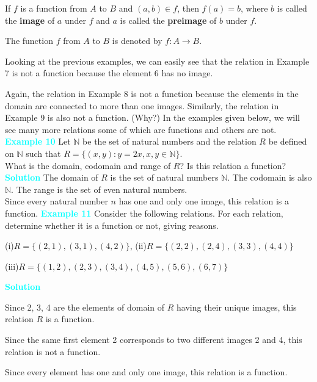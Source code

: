 \documentclass[11pt]{article}
\begin{document}
If $f$ is a function from $A$ to $B$ and $(a, b) \in f$, then $f(a) = b$, where $b$ is called the \textbf{image} of $a$ under $f$ and $a$ is called the \textbf{preimage} of $b$ under $f$.

 The function $f$ from $A$ to $B$ is denoted by $f: A \to B$.
\vspace{10pt}

 Looking at the previous examples, we can easily see that the relation in Example 7 is not a function because the element 6 has no image.

\vspace{5pt}
 Again, the relation in Example 8 is not a function because the elements in the domain are connected to more than one images. Similarly, the relation in Example 9 is also not a function. (Why?) In the examples given below, we will see many more relations some of which are functions and others are not.
\textcolor{cyan}{
\noindent \textbf{Example 10}} Let $\mathbb{N}$ be the set of natural numbers and the relation $R$ be defined on $\mathbb{N}$ such that $R = \{(x, y) : y = 2x, x, y \in \mathbb{N}\}$. \\
What is the domain, codomain and range of $R$? Is this relation a function?
\vspace{5pt}
\textcolor{cyan}{
\noindent \textbf{Solution}} The domain of $R$ is the set of natural numbers $\mathbb{N}$. The codomain is also $\mathbb{N}$. The range is the set of even natural numbers. \\
Since every natural number $n$ has one and only one image, this relation is a function.
\vspace{15pt}
\textcolor{cyan}{\textbf{Example 11}}  
Consider the following relations. For each relation, determine whether it is a function or not, giving reasons.
\medskip
\begin{center}
(i)\quad $R = \{(2,1),(3,1),(4,2)\}$, (ii)\quad $R = \{(2,2),(2,4),(3,3),(4,4)\}$
\end{center}
\begin{center}
    (iii)\quad $R = \{(1,2),(2,3),(3,4),(4,5),(5,6),(6,7)\}$
\end{center}
\vspace{0.35cm}
\noindent\textcolor{cyan}{\textbf{Solution}}
\begin{enumerate*}[label=(\roman*), itemjoin=\quad, itemjoin*=\quad]
\item Since 2, 3, 4 are the elements of domain of $R$ having their unique images, this relation $R$ is a function.\\
\item Since the same first element 2 corresponds to two different images 2 and 4, this relation is not a function.\\
\item Since every element has one and only one image, this relation is a function.
\end{enumerate*}
\end{document}
